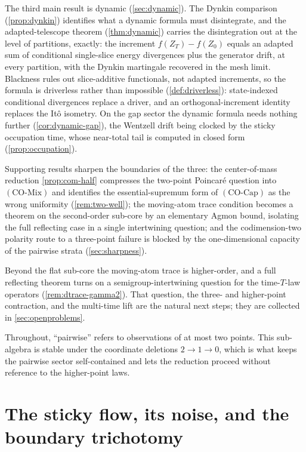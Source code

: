 \documentclass[reqno,final,11pt]{amsart}
\theoremstyle{plain}
\theoremstyle{definition}
\theoremstyle{remark}
\newcommand{\COcap}{(\mathrm{CO\text{-}Cap})}
\newcommand{\COmix}{(\mathrm{CO\text{-}Mix})}
\begin{document}
The third main result is dynamic (\cref{sec:dynamic}). The Dynkin
comparison (\cref{prop:dynkin}) identifies what a dynamic formula must
disintegrate, and the adapted-telescope theorem (\cref{thm:dynamic}) carries
the disintegration out at the level of partitions, exactly: the increment
$f(Z_T)-f(Z_0)$ equals an adapted sum of conditional single-slice energy
divergences plus the generator drift, at every partition, with the Dynkin
martingale recovered in the mesh limit. Blackness rules out slice-additive
functionals, not adapted increments, so the formula is driverless rather than
impossible (\cref{def:driverless}): state-indexed conditional divergences
replace a driver, and an orthogonal-increment identity replaces the It\^o
isometry. On the gap sector the dynamic formula needs nothing further (\cref{cor:dynamic-gap}),
the Wentzell drift being clocked by the sticky occupation time, whose
near-total tail is computed in closed form (\cref{prop:occupation}).

Supporting results sharpen the boundaries of the three:
the center-of-mass reduction \cref{prop:com-half} compresses the two-point
Poincar\'e question into $\COmix$ and identifies the essential-supremum form
of $\COcap$ as the wrong uniformity (\cref{rem:two-well}); the moving-atom
trace condition becomes a theorem on the second-order sub-core by an
elementary Agmon bound, isolating the full reflecting case in a single
intertwining question; and the codimension-two polarity route to a
three-point failure is blocked by the one-dimensional capacity of the
pairwise strata (\cref{sec:sharpness}).

Beyond the flat sub-core the moving-atom trace is higher-order, and a
full reflecting theorem turns on a semigroup-intertwining question for the
time-$T$-law operators (\cref{rem:dtrace-gamma2}). That question, the three- and
higher-point contraction, and the multi-time lift are the natural next steps;
they are collected in \cref{sec:openproblems}.

Throughout, ``pairwise'' refers to observations of at most two points. This
sub-algebra is stable under the coordinate deletions $2\to1\to0$, which is what
keeps the pairwise sector self-contained and lets the reduction proceed without
reference to the higher-point laws.

\section{The sticky flow, its noise, and the boundary trichotomy}\label{sec:flow}
\end{document}
